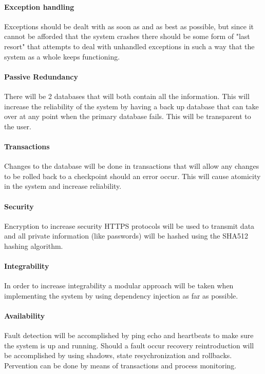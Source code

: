 \documentclass[english]{article}
\begin{document}
			\paragraph{Exception handling}\indent
			Exceptions should be dealt with as soon as and as best as possible, but since it cannot be afforded that the system crashes there should be some form of "last resort" that attempts to deal with unhandled exceptions in such a way that the system as a whole keeps functioning.
			
			\paragraph{Passive Redundancy}\indent
			There will be 2 databases that will both contain all the information. This will increase the reliability of the system by having a back up database that can take over at any point when the primary database fails. This will be transparent to the user.
			
			\paragraph{Transactions}\indent
			Changes to the database will be done in transactions that will allow any changes to be rolled back to a checkpoint should an error occur. This will cause atomicity in the system and increase reliability.
			
			\paragraph{Security}\indent
			Encryption to increase security HTTPS protocols will be used to transmit data and all private information (like passwords) will be hashed using the SHA512 hashing algorithm.
			
			\paragraph{Integrability}\indent
			In order to increase integrability a modular approach will be taken when implementing the system by using dependency injection as far as possible.
			
			\paragraph{Availability}\indent
			Fault detection will be accomplished by ping echo and heartbeats to make sure the system is up and running. Should a fault occur recovery reintroduction will be accomplished by using shadows, state resychronization and rollbacks. Pervention can be done by means of transactions and process monitoring.
			
\end{document}
